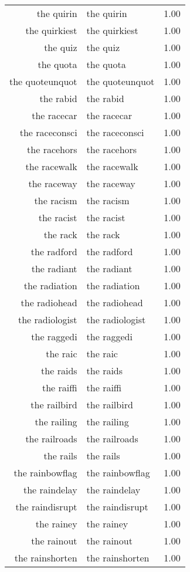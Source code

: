 \begin{table}[ht]
\begin{tabular}{rlr}
  the quirin & the quirin & 1.00 \\ 
  the quirkiest & the quirkiest & 1.00 \\ 
  the quiz & the quiz & 1.00 \\ 
  the quota & the quota & 1.00 \\ 
  the quoteunquot & the quoteunquot & 1.00 \\ 
  the rabid & the rabid & 1.00 \\ 
  the racecar & the racecar & 1.00 \\ 
  the raceconsci & the raceconsci & 1.00 \\ 
  the racehors & the racehors & 1.00 \\ 
  the racewalk & the racewalk & 1.00 \\ 
  the raceway & the raceway & 1.00 \\ 
  the racism & the racism & 1.00 \\ 
  the racist & the racist & 1.00 \\ 
  the rack & the rack & 1.00 \\ 
  the radford & the radford & 1.00 \\ 
  the radiant & the radiant & 1.00 \\ 
  the radiation & the radiation & 1.00 \\ 
  the radiohead & the radiohead & 1.00 \\ 
  the radiologist & the radiologist & 1.00 \\ 
  the raggedi & the raggedi & 1.00 \\ 
  the raic & the raic & 1.00 \\ 
  the raids & the raids & 1.00 \\ 
  the raiffi & the raiffi & 1.00 \\ 
  the railbird & the railbird & 1.00 \\ 
  the railing & the railing & 1.00 \\ 
  the railroads & the railroads & 1.00 \\ 
  the rails & the rails & 1.00 \\ 
  the rainbowflag & the rainbowflag & 1.00 \\ 
  the raindelay & the raindelay & 1.00 \\ 
  the raindisrupt & the raindisrupt & 1.00 \\ 
  the rainey & the rainey & 1.00 \\ 
  the rainout & the rainout & 1.00 \\ 
  the rainshorten & the rainshorten & 1.00 \\ 

\end{tabular}
\end{table}
